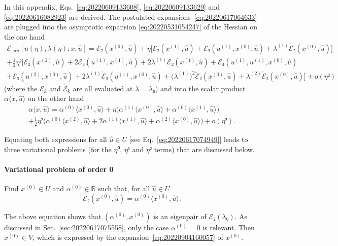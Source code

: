 \documentclass[12pt, final]{scrartcl}
\theoremstyle{definition}
\newcommand{\order}[2][1]{#2^{(#1)}}
\newcommand{\reals}{\mathbb{R}}
\begin{document}
In this appendix, Eqs.~\eqref{eq:20220609133608}, \eqref{eq:20220609133629} and
\eqref{eq:20220616082923} are derived. The postulated
expansions~\eqref{eq:20220617064633} are plugged into the asymptotic expansion
\eqref{eq:20220531054247} of the Hessian on the one hand
\begin{multline*}
  ℰ_{, uu} [u(η), λ(η); x, \hat{u}] = ℰ₂(\order[0]x, \hat{u}) + η \bigl[ ℰ₂(\order[1]x, \hat{u}) + ℰ₃(\order[1]u, \order[0]x, \hat{u}) + \order[1]λ \dot{ℰ}₂(\order[0]x, \hat{u})\bigr]\\
  + \tfrac{1}{2} η² \bigl[ℰ₂(\order[2]x, \hat{u}) + 2ℰ₃(\order[1]u, \order[1]x, \hat{u}) + 2 \order[1]λ \dot{ℰ}₂(\order[1]x, \hat{u}) + ℰ₄(\order[1]u, \order[1]u, \order[0]x, \hat{u})\\
  + ℰ₃(\order[2]u, \order[0]x, \hat{u}) + 2\order[1]λ \dot{ℰ}₃(\order[1]u, \order[0]x, \hat{u}) + \bigl( \order[1]λ \bigr)^2 \ddot{ℰ}₂(\order[0]x, \hat{u}) + \order[2]λ \dot{ℰ}₂(\order[0]x, \hat{u}) \bigr] + o(η²)
\end{multline*}
(where the \(ℰ_k\) and \(\dot{ℰ}_k\) are all evaluated at \(λ=λ₀\)) and into the
scalar product \(α 〈 x, \hat{u} 〉\) on the other hand
\begin{multline*}
    α 〈 x, \hat{u} 〉 = \order[0]α 〈 \order[0]x, \hat{u} 〉 + η \bigl(\order[1]α 〈 \order[0]x, \hat{u} 〉 + \order[0]α 〈 \order[1]x, \hat{u} 〉\bigr)\\
    + \tfrac{1}{2} η² \bigl(\order[0]α 〈 \order[2]x, \hat{u} 〉 + 2 \order[1]α 〈 \order[1]x, \hat{u} 〉 + \order[2]α 〈 \order[0]x, \hat{u} 〉\bigr) + o(η²).
\end{multline*}

Equating both expressions for all \(\hat{u} ∈ U\) [see
Eq.~\eqref{eq:20220617074949}] leads to three variational problems (for the
\(η⁰\), \(η¹\) and \(η²\) terms) that are discussed below.

\paragraph{Variational problem of order 0} Find \(\order[0]x∈U\) and \(\order[0]α∈\reals\) such
that, for all \(\hat{u}∈U\)
\begin{equation*}
  ℰ₂(\order[0]x, \hat{u}) = \order[0]α 〈 \order[0]x, \hat{u} 〉.
\end{equation*}

The above equation shows that \((\order[0]α, \order[0]x)\) is an eigenpair of \(ℰ₂(λ₀)\). As
discussed in Sec.~\ref{sec:20220617075558}, only the case \(\order[0]α = 0\) is
relevant. Then \(\order[0]x ∈ V\), which is expressed by the
expansion~\eqref{eq:20220904160057} of \(\order[0]x\).
\end{document}
